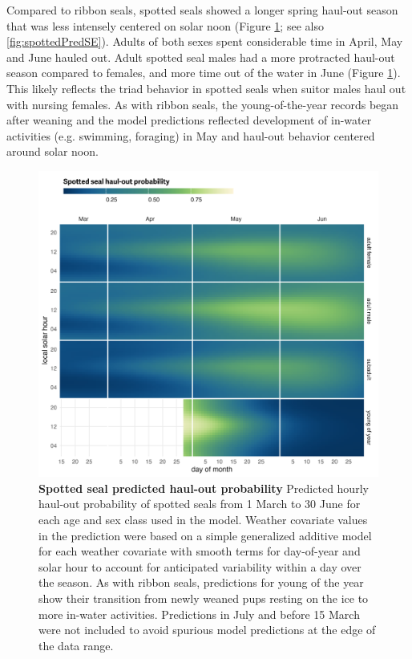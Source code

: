 \documentclass[fleqn,10pt,lineno]{wlpeerj} %
\begin{document}
Compared to ribbon seals, spotted seals showed a longer spring haul-out season
that was less intensely centered on solar noon (Figure \ref{fig:spottedHOCal};
see also \ref{fig:spottedPredSE}). Adults of both sexes spent considerable time
in April, May and June hauled out. Adult spotted seal males had a more
protracted haul-out season compared to females, and more time out of the water
in June (Figure \ref{fig:spottedHOCal}). This likely reflects the triad
behavior in spotted seals when suitor males haul out with nursing females. As
with ribbon seals, the young-of-the-year records began after weaning and the
model predictions reflected development of in-water activities (e.g.
swimming, foraging) in May and haul-out behavior centered around solar noon.



\begin{figure}
\includegraphics[width=1\linewidth]{../figures/Figure-009} \caption{\textbf{Spotted seal predicted haul-out probability} \linebreak Predicted hourly haul-out probability of spotted seals from 1 March to 30 June for each age and sex class used in the model. Weather covariate values in the prediction were based on a simple generalized additive model for each weather covariate with smooth terms for day-of-year and solar hour to account for anticipated variability within a day over the season. As with ribbon seals, predictions for young of the year show their transition from newly weaned pups resting on the ice to more in-water activities. Predictions in July and before 15 March were not included to avoid spurious model predictions at the edge of the data range.}\label{fig:spottedHOCal}
\end{figure}
\end{document}
